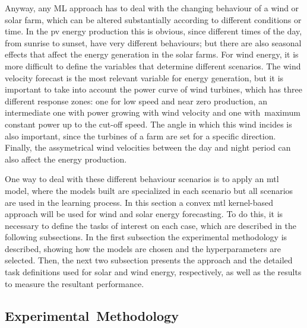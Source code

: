 Anyway, any ML approach has to deal with the changing behaviour of a wind or solar farm, which can be altered substantially according to different conditions or time.
In the \acrfull{pv} energy production this is obvious, since different times of the day, from sunrise to sunset, have very different behaviours; but there are also seasonal effects that affect the energy generation in the solar farms.
For wind energy, it is more difficult to define the variables that determine different scenarios. 
The wind velocity forecast is the most relevant variable for energy generation, but it is important to take into account the power curve of wind turbines, which has three different response zones: one for low speed and near zero production, an intermediate one with power growing with wind velocity and one with~maximum constant power up to the cut-off speed.
The angle in which this wind incides is also important, since the turbines of a farm are set for a specific direction. 
Finally, the assymetrical wind velocities between the day and night period can also affect the energy production.

One way to deal with these different behaviour scenarios is to apply an \acrshort{mtl} model, where the models built are specialized in each scenario but all scenarios are used in the learning process.
In this section a convex \acrshort{mtl} kernel-based approach will be used for wind and solar energy forecasting. To do this, it is necessary to define the tasks of interest on each case, which are described in the following subsections.
In the first subsection the experimental methodology is described, showing how the models are chosen and the hyperparameters are selected. Then, the next two subsection presents the approach and the detailed task definitions used for solar and wind energy, respectively, as well as the results to measure the resultant performance.

\subsection{Experimental~Methodology}

